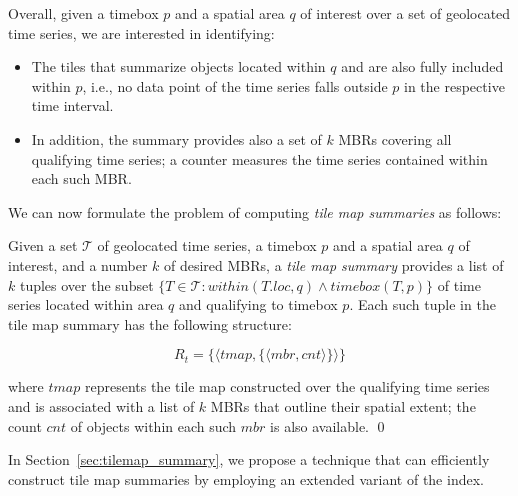 Overall, given a timebox $p$ and a spatial area $q$ of interest over a set of geolocated time series, we are interested in identifying:
\begin{itemize} 
\item The tiles that summarize objects located within $q$ and are also fully included within $p$, i.e., no data point of the time series falls outside $p$ in the respective time interval.
\item In addition, the summary provides also a set of $k$ MBRs covering all qualifying time series; a counter measures the time series contained within each such MBR. 
\end{itemize}
 
We can now formulate the problem of computing {\em tile map summaries} as follows:


\begin{problem} 
Given a set $\mathcal{T}$ of geolocated time series, a timebox $p$ and a spatial area $q$ of interest, and a number $k$ of desired MBRs, a {\em tile map summary} provides a list of $k$ tuples over the subset $\{ T \in \mathcal{T} : within(T.loc, q) \wedge timebox(T, p) \}$ of time series located within area $q$ and qualifying to timebox $p$. Each such tuple in the tile map summary has the following structure:

\begin{equation} \label{eq:tmap_sum}
R_t = \{ \langle tmap, \{\langle mbr, cnt \rangle \}\rangle\}
\end{equation}

\noindent where $tmap$ represents the tile map constructed over the qualifying time series and is associated with a list of $k$ MBRs that outline their spatial extent; the count $cnt$ of objects within each such $mbr$ is also available.
\qed
\end{problem}


In Section~\ref{sec:tilemap_summary}, we propose a technique that can efficiently construct tile map summaries by employing an extended variant of the \isax index.